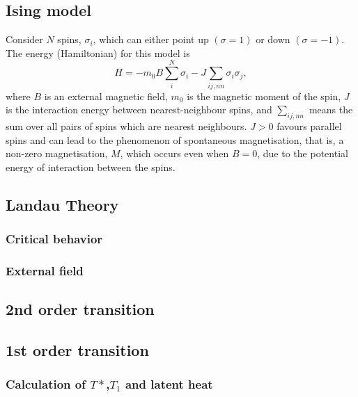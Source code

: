 \documentclass[12pt,a4paper]{article}
\begin{document}
\subsection{Ising model}
Consider $N$ spins, $\sigma_i$, which can either point up $(\sigma=1)$ or down $(\sigma=-1)$. The energy (Hamiltonian) for this model is
$$
H=-m_0 B \sum_i^N \sigma_i-J \sum_{i j, n n} \sigma_i \sigma_j,
$$
where $B$ is an external magnetic field, $m_0$ is the magnetic moment of the spin, $J$ is the interaction energy between nearest-neighbour spins, and $\sum_{i j, n n}$ means the sum over all pairs of spins which are nearest neighbours. $J>0$ favours parallel spins and can lead to the phenomenon of spontaneous magnetisation, that is, a non-zero magnetisation, $M$, which occurs even when $B=0$, due to the potential energy of interaction between the spins.
\subsection{Landau Theory}
\subsubsection{Critical behavior}
\subsubsection{External field}
\subsection{2nd order transition}
\subsection{1st order transition}
\subsubsection{Calculation of $T*$,$T_1$ and latent heat}
\end{document}
